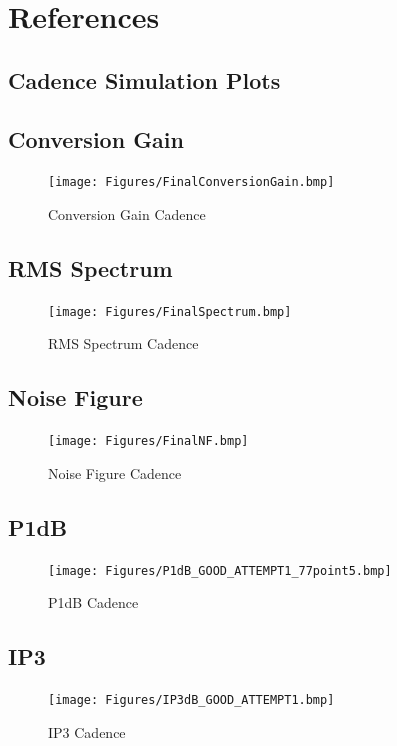 \documentclass{article}                                                         %
\begin{document}
\section{References}
\printbibliography[heading=none]

\newpage
\begin{appendices}
\section{Cadence Simulation Plots}\label{app:cresults}
\subsection{Conversion Gain}
\begin{figure}[H]
  \centering
  \texttt{[image: Figures/FinalConversionGain.bmp]}
  \caption{Conversion Gain Cadence}
    \label{fig:cGain}
\end{figure}
\subsection{RMS Spectrum}
\begin{figure}[H]
  \centering
  \texttt{[image: Figures/FinalSpectrum.bmp]}
  \caption{RMS Spectrum Cadence}
    \label{fig:cSpectrum}
\end{figure}
\subsection{Noise Figure}
\begin{figure}[H]
  \centering
  \texttt{[image: Figures/FinalNF.bmp]}
  \caption{Noise Figure Cadence}
    \label{fig:cNF}
\end{figure}
\subsection{P1dB}
\begin{figure}[H]
  \centering
  \texttt{[image: Figures/P1dB\_GOOD\_ATTEMPT1\_77point5.bmp]}
  \caption{P1dB Cadence}
    \label{fig:cP1db}
\end{figure}
\subsection{IP3}
\begin{figure}[H]
  \centering
  \texttt{[image: Figures/IP3dB\_GOOD\_ATTEMPT1.bmp]}
  \caption{IP3 Cadence}
    \label{fig:cIP3}
\end{figure}

\end{appendices}
\end{document}
